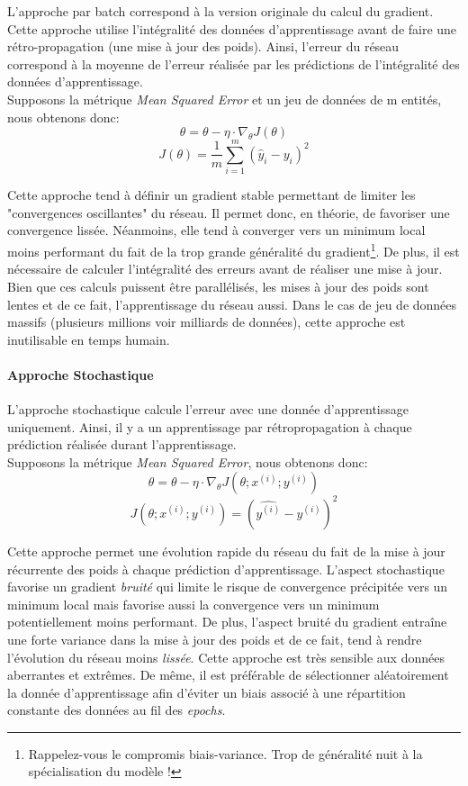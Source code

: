 \noindent L'approche par batch correspond à la version originale du calcul du gradient. Cette approche utilise l'intégralité des données d'apprentissage avant de faire une rétro-propagation (une mise à jour des poids). Ainsi, l'erreur du réseau correspond à la moyenne de l'erreur réalisée par les prédictions de l'intégralité des données d'apprentissage.\\

\noindent Supposons la métrique \textit{Mean Squared Error} et un jeu de données de m entités, nous obtenons donc:
$$ \theta = \theta - \eta \cdot \nabla_\theta J(\theta)$$
$$ J(\theta) = \frac{1}{m}\sum_{i=1}^m(\hat{y}_i-y_i)^2$$

\noindent Cette approche tend à définir un gradient stable permettant de limiter les "convergences oscillantes" du réseau. Il permet donc, en théorie, de favoriser une convergence lissée. Néanmoins, elle tend à converger vers un minimum local moins performant du fait de la trop grande généralité du gradient\footnote{Rappelez-vous le compromis biais-variance. Trop de généralité nuit à la spécialisation du modèle !}. De plus, il est nécessaire de calculer l'intégralité des erreurs avant de réaliser une mise à jour. Bien que ces calculs puissent être parallélisés, les mises à jour des poids sont lentes et de ce fait, l'apprentissage du réseau aussi. Dans le cas de jeu de données massifs (plusieurs millions voir milliards de données), cette approche est inutilisable en temps humain.\\

\paragraph{Approche Stochastique}

\noindent L'approche stochastique calcule l'erreur avec une donnée d'apprentissage uniquement. Ainsi, il y a un apprentissage par rétropropagation à chaque prédiction réalisée durant l'apprentissage.\\

\noindent Supposons la métrique \textit{Mean Squared Error}, nous obtenons donc:
$$\theta = \theta - \eta \cdot \nabla_\theta J( \theta; x^{(i)}; y^{(i)})$$
$$ J(\theta; x^{(i)}; y^{(i)}) = (\hat{y^{(i)}}-y^{(i)})^2$$

\noindent Cette approche permet une évolution rapide du réseau du fait de la mise à jour récurrente des poids à chaque prédiction d'apprentissage. L'aspect stochastique favorise un gradient \textit{bruité} qui limite le risque de convergence précipitée vers un minimum local mais favorise aussi la convergence vers un minimum potentiellement moins performant. De plus, l'aspect bruité du gradient entraîne une forte variance dans la mise à jour des poids et de ce fait, tend à rendre l'évolution du réseau moins \textit{lissée}. Cette approche est très sensible aux données aberrantes et extrêmes. De même, il est préférable de sélectionner aléatoirement la donnée d'apprentissage afin d'éviter un biais associé à une répartition constante des données au fil des \textit{epochs}.\\

